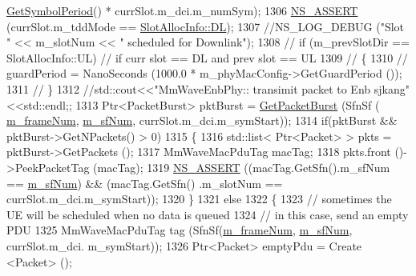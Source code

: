 \begin{DoxyCode}
      \hyperlink{classns3_1_1MmWavePhyMacCommon_a1048fa4a24a72abc5d4d982efd6c21af}{GetSymbolPeriod}() * currSlot.m\_dci.m\_numSym);
1306                 \hyperlink{assert_8h_a6dccdb0de9b252f60088ce281c49d052}{NS\_ASSERT} (currSlot.m\_tddMode == \hyperlink{structns3_1_1SlotAllocInfo_a6cad60db1d39034f1851e2cea625fe5da9a365c9c56b7c32dcae38ee1a468ce6d}{SlotAllocInfo::DL});
1307                 \textcolor{comment}{//NS\_LOG\_DEBUG ("Slot " << m\_slotNum << " scheduled for Downlink");}
1308                 \textcolor{comment}{//                      if (m\_prevSlotDir == SlotAllocInfo::UL)  // if curr slot == DL and
       prev slot == UL}
1309                 \textcolor{comment}{//                      \{}
1310                 \textcolor{comment}{//                              guardPeriod = NanoSeconds (1000.0 *
       m\_phyMacConfig->GetGuardPeriod ());}
1311                 \textcolor{comment}{//                      \}}
1312                 \textcolor{comment}{//std::cout<<"MmWaveEnbPhy:: transimit packet to Enb sjkang" <<std::endl;;}
1313                 Ptr<PacketBurst> pktBurst = \hyperlink{classns3_1_1MmWavePhy_acc47ea975529c5c4ae3ad138fb3f4278}{GetPacketBurst} (SfnSf (
      \hyperlink{classns3_1_1MmWavePhy_a852ce585035a1c12122d2775e64ff38a}{m\_frameNum}, \hyperlink{classns3_1_1MmWavePhy_af3d76eb9f3e5e1ff669852d05986c1a3}{m\_sfNum}, currSlot.m\_dci.m\_symStart));
1314                 \textcolor{keywordflow}{if}(pktBurst && pktBurst->GetNPackets() > 0)
1315                 \{
1316                         std::list< Ptr<Packet> > pkts = pktBurst->GetPackets ();
1317                         MmWaveMacPduTag macTag;
1318                         pkts.front ()->PeekPacketTag (macTag);
1319                         \hyperlink{assert_8h_a6dccdb0de9b252f60088ce281c49d052}{NS\_ASSERT} ((macTag.GetSfn().m\_sfNum == \hyperlink{classns3_1_1MmWavePhy_af3d76eb9f3e5e1ff669852d05986c1a3}{m\_sfNum}) && (macTag.GetSfn()
      .m\_slotNum == currSlot.m\_dci.m\_symStart));
1320                 \}
1321                 \textcolor{keywordflow}{else}
1322                 \{
1323                         \textcolor{comment}{// sometimes the UE will be scheduled when no data is queued}
1324                         \textcolor{comment}{// in this case, send an empty PDU}
1325                         MmWaveMacPduTag tag (SfnSf(\hyperlink{classns3_1_1MmWavePhy_a852ce585035a1c12122d2775e64ff38a}{m\_frameNum}, \hyperlink{classns3_1_1MmWavePhy_af3d76eb9f3e5e1ff669852d05986c1a3}{m\_sfNum}, currSlot.m\_dci.
      m\_symStart));
1326                         Ptr<Packet> emptyPdu = Create <Packet> ();

\end{DoxyCode}
